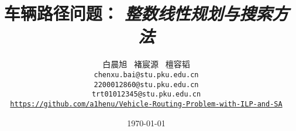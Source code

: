 \documentclass[12pt, a4paper]{article}
\title{车辆路径问题： \emph{整数线性规划与搜索方法}}
\author{
    白晨旭 \, 褚宸源 \, 檀容韬 \\
    {\tt\small chenxu.bai@stu.pku.edu.cn}\\
    {\tt\small 2200012860@stu.pku.edu.cn}\\
    {\tt\small trt01012345@stu.pku.edu.cn}\\
    {\tt\small \url{https://github.com/a1henu/Vehicle-Routing-Problem-with-ILP-and-SA}}
}
\date{\today}
\begin{document}
\maketitle







{
    \small
    
    
}
\end{document}
